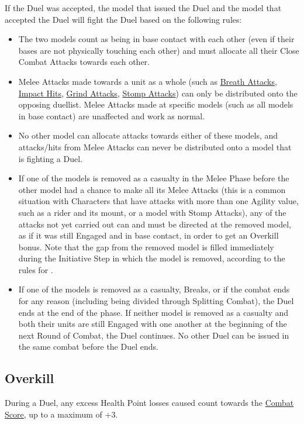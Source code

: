 If the Duel was accepted, the model that issued the Duel and the model that accepted the Duel will fight the Duel based on the following rules:
\begin{itemize}
\item The two models count as being in base contact with each other (even if their bases are not physically touching each other) and must allocate all their Close Combat Attacks towards each other.
\item Melee Attacks made towards a unit as a whole (such as \hyperref[breath_attack]{Breath Attacks}, \hyperref[impact_hits]{Impact Hits}, \hyperref[grind_attacks]{Grind Attacks}, \hyperref[stomp_attacks]{Stomp Attacks}) can only be distributed onto the opposing duellist. Melee Attacks made at specific models (such as all models in base contact) are unaffected and work as normal.
\item No other model can allocate attacks towards either of these models, and attacks/hits from Melee Attacks can never be distributed onto a model that is fighting a Duel.
\item If one of the models is removed as a casualty in the Melee Phase before the other model had a chance to make all its Melee Attacks (this is a common situation with Characters that have attacks with more than one Agility value, such as a rider and its mount, or a model with Stomp Attacks), any of the attacks not yet carried out can and must be directed at the removed model, as if it was still Engaged and in base contact, in order to get an Overkill bonus. Note that the gap from the removed model is filled immediately during the Initiative Step in which the model is removed, according to the rules for .
\item If one of the models is removed as a casualty, Breaks, or if the combat ends for any reason (including being divided through Splitting Combat), the Duel ends at the end of the phase. If neither model is removed as a casualty and both their units are still Engaged with one another at the beginning of the next Round of Combat, the Duel continues. No other Duel can be issued in the same combat before the Duel ends.
\end{itemize}

\subsection{Overkill}
\label{overkill}

During a Duel, any excess Health Point losses caused count towards the \hyperref[combat_score]{Combat Score}, up to a maximum of +3.

